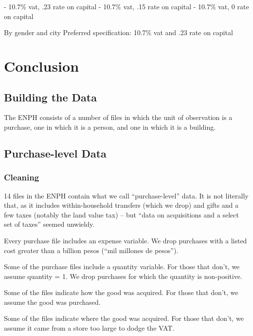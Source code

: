 \documentclass[12pt]{article}
\begin{document}
- 10.7\% vat, .23 rate on capital
- 10.7\% vat, .15 rate on capital
- 10.7\% vat,  0 rate on capital

By gender and city
Preferred specification: 10.7\% vat and .23 rate on capital

\section{Conclusion}

\citet{microsim}

\iffalse [[ AN ECONOMIST: What in / what document about the microsim
    do we intend to be citing here?
    --jbb ]]
\fi

\begin{appendices}
\section{Building the Data}
The ENPH consists of a number of files
in which the unit of observation is a purchase,
one in which it is a person,
and one in which it is a building.

\subsection{Purchase-level Data}

\subsubsection{Cleaning}

14 files in the ENPH contain what we call ``purchase-level'' data.
It is not literally that,
as it includes within-household transfers (which we drop)
and gifts
and a few taxes (notably the land value tax) --
but ``data on acquisitions and a select set of taxes''
seemed unwieldy.

Every purchase file includes an expense variable.
We drop purchases with a listed cost greater than a billion pesos
(``mil millones de pesos'').

Some of the purchase files include a quantity variable.
For those that don't, we assume quantity = 1.
We drop purchases for which the quantity is non-positive.

Some of the files indicate how the good was acquired.
For those that don't, we assume the good was purchased.

Some of the files indicate where the good was acquired.
For those that don't,
we assume it came from a store too large to dodge the VAT.


\end{appendices}
\end{document}
